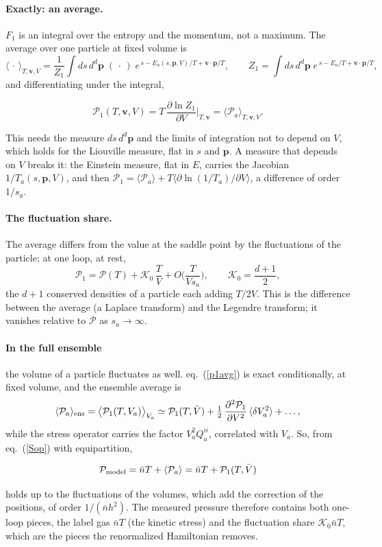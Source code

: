 \documentclass[11pt,aps,preprint,nofootinbib,superscriptaddress,tightenlines]{revtex4-2}
\newcommand{\avg}[1]{\langle #1\rangle}
\def\pr{{\mathcal P}}
\def\st{\begin{equation}}
\def\stp{\end{equation}}
\def\Eq#1{eq.~(\ref{#1})}
\let\oldparagraph\paragraph
\renewcommand{\paragraph}{\par\bigskip\oldparagraph}
\begin{document}
\paragraph{Exactly: an average.}  $F_1$ is an integral over the entropy and the momentum, not a maximum.  The average over one particle at fixed volume is
\st
\avg{\,\cdot\,}_{T,\bm v,V}=\frac1{Z_1}\int ds\,d^d\bm p\;(\,\cdot\,)\;e^{\,s-E_a(s,\bm p,V)/T+\bm v\cdot\bm p/T},\qquad Z_1=\int ds\,d^d\bm p\;e^{\,s-E_a/T+\bm v\cdot\bm p/T} ,
\stp
and differentiating under the integral,
\begin{keyeq}
\st
\pr_1(T,\bm v,V)=T\,\frac{\partial\ln Z_1}{\partial V}\Big|_{T,\bm v}=\avg{\pr_a}_{T,\bm v,V} .
\label{p1avg}
\stp
\end{keyeq}
This needs the measure $ds\,d^d\bm p$ and the limits of integration not to depend on $V$, which holds for the Liouville measure, flat in $s$ and $\bm p$.  A measure that
depends on $V$ breaks it: the Einstein measure, flat in $E$, carries the Jacobian $1/T_a(s,\bm p,V)$, and then $\pr_1=\avg{\pr_a}+T\avg{\partial\ln(1/T_a)/\partial V}$, a
difference of order $1/s_a$.

\paragraph{The fluctuation share.}  The average differs from the value at the saddle point by the fluctuations of the particle; at one loop, at rest,
\st
\pr_1=\pr(T)+\mathcal K_0\,\frac TV+O\Big(\frac T{Vs_a}\Big),\qquad \mathcal K_0=\frac{d+1}2 ,
\stp
the $d+1$ conserved densities of a particle each adding $T/2V$.  This is the difference between the average (a Laplace transform) and the Legendre transform; it
vanishes relative to $\pr$ as $s_a\to\infty$.

\paragraph{In the full ensemble} the volume of a particle fluctuates as well.  \Eq{p1avg} is exact conditionally, at fixed volume, and the ensemble average is
\st
\avg{\pr_a}_{\rm ens}=\big\langle\pr_1(T,V_a)\big\rangle_{V_a}\simeq\pr_1(T,\bar V)+\tfrac12\,\frac{\partial^2\pr_1}{\partial V^2}\,\avg{\delta V_a^2}+\dots ,
\stp
while the stress operator carries the factor $V_a^2Q_a^{ii}$, correlated with $V_a$.  So, from \Eq{Sop} with equipartition,
\begin{keyeq}
\st
\pr_{\rm model}=\bar nT+\avg{\pr_a}=\bar nT+\pr_1(T,\bar V)
\label{pmodel}
\stp
\end{keyeq}
holds up to the fluctuations of the volumes, which add the correction of the positions, of order $1/(\bar nh^2)$.  The measured pressure therefore contains both
one-loop pieces, the label gas $\bar nT$ (the kinetic stress) and the fluctuation share $\mathcal K_0\bar nT$, which are the pieces the renormalized Hamiltonian
removes.
\end{document}

